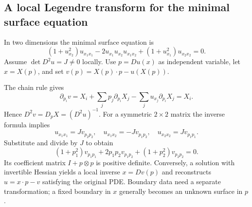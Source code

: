 \Needspace{35mm}
\subsection{A local Legendre transform for the minimal surface equation}
In two dimensions the minimal surface equation is
\[
 (1+u_{x_2}^2)u_{x_1x_1}
 -2u_{x_1}u_{x_2}u_{x_1x_2}
 +(1+u_{x_1}^2)u_{x_2x_2}=0 .
\]
Assume $\det D^2u=J\ne0$ locally.
Use $p=Du(x)$ as independent variable, let $x=X(p)$, and set
$v(p)=X(p)\cdot p-u(X(p))$.
\begin{expandedproof}
The chain rule gives
\[
 \partial_{p_i}v=X_i+\sum_jp_j\partial_{p_i}X_j
                 -\sum_ju_{x_j}\partial_{p_i}X_j=X_i .
\]
Hence $D^2v=D_pX=(D^2u)^{-1}$.
For a symmetric $2\times2$ matrix the inverse formula implies
\[
 u_{x_1x_1}=Jv_{p_2p_2},\quad
 u_{x_1x_2}=-Jv_{p_1p_2},\quad
 u_{x_2x_2}=Jv_{p_1p_1}.
\]
Substitute and divide by $J$ to obtain
\[
 (1+p_1^2)v_{p_1p_1}+2p_1p_2v_{p_1p_2}
                    +(1+p_2^2)v_{p_2p_2}=0 .
\]
Its coefficient matrix $I+p\otimes p$ is positive definite.
Conversely, a solution with invertible Hessian yields a local inverse
$x=Dv(p)$ and reconstructs $u=x\cdot p-v$ satisfying the original PDE.
Boundary data need a separate transformation; a fixed boundary in
$x$ generally becomes an unknown surface in $p$.
\end{expandedproof}
\Needspace{45mm}

